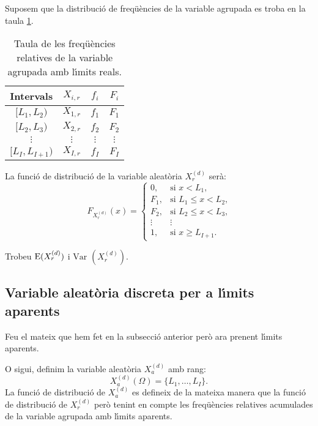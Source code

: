 Suposem que la distribuci\'o de 
freq\"u\`encies de la variable
agrupada es troba en la taula \ref{TAULAVARIABLEAGRUPADAREAL}.
\begin{table}[h]
\begin{center}
\begin{tabular}{|c|c|c|c|}
\hline
Intervals&$X_{i,r}$&$f_i$&$F_i$\\\hline\hline
$[L_1,L_2)$&$X_{1,r}$&$f_1$&$F_1$\\\hline
$[L_2,L_3)$&$X_{2,r}$&$f_2$&$F_2$\\\hline
$\vdots$&$\vdots$&$\vdots$&$\vdots$\\\hline
$[L_I,L_{I+1})$&$X_{I,r}$&$f_I$&$F_I$\\\hline
\end{tabular}
\end{center}
\caption{Taula de les freq\"u\`encies
 relatives de la variable 
agrupada amb l\'{\i}mits reals.}

\label{TAULAVARIABLEAGRUPADAREAL}
\end{table}

La funci\'o de distribuci\'o de la variable 
aleat\`oria $X_r^{(d)}$ ser\`a:
\[
F_{X_r^{(d)}}(x)=  
\left\{
\begin{array}{ll}
0, & \mbox{si $x< L_1$,} \\
F_1, & \mbox{si $L_1\leq x < L_2$,} \\
F_2, & \mbox{si $L_2\leq x < L_3$,} \\
\vdots & \vdots \\
1, & \mbox{si $x\geq L_{I+1}$.}
\end{array}
\right.
\]

Trobeu ${\rm E} (X_r^{(d)})$ i $\mbox{Var }(X_r^{(d)})$.

\subsection*{Variable aleat\`oria discreta per a l\'{\i}mits aparents}

Feu el mateix que hem fet en la subsecci\'o anterior per\`o ara 
prenent l\'{\i}mits aparents.

O sigui, definim la variable aleat\`oria $X_a^{(d)}$ amb rang:
\[
X_a^{(d)} (\Omega) =\{L_1,\ldots,L_I\}.
\]
La funci\'o de distribuci\'o de $X_a^{(d)}$ 
es defineix de la mateixa manera que la funci\'o de distribuci\'o
 de $X_r^{(d)}$ per\`o
tenint en compte les freq\"u\`encies
 relatives 
acumulades de la variable agrupada amb l\'{\i}mits 
aparents.


